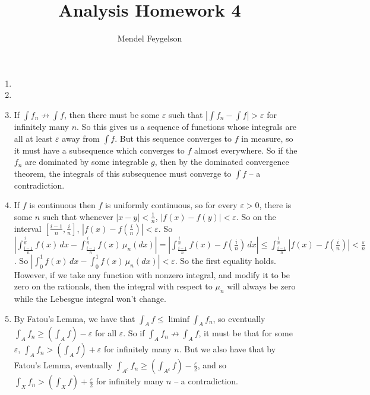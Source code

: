 \documentclass{article}
\title{Analysis Homework 4}
\author{Mendel Feygelson}
\begin{document}
\maketitle
\begin{enumerate}

  \item 
  \item
  \item If $\int f_n \not\to \int f$, then there must be some $\varepsilon$ such
     that $|\int f_n - \int f| > \varepsilon$ for infinitely many $n$. So this
     gives us a sequence of functions whose integrals are all at least
     $\varepsilon$ away from $\int f$. But this sequence converges to $f$ in
     measure, so it must have a subsequence which converges to $f$ almost
     everywhere. So if the $f_n$ are dominated by some integrable $g$, then by
     the dominated convergence theorem, the integrals of this subsequence must
     converge to $\int f$ -- a contradiction.

  \item

     If $f$ is continuous then $f$ is uniformly continuous, so for every
     $\varepsilon>0$, there is some $n$ such that whenever $|x-y| < \frac1n$,
     $|f(x) - f(y)| < \varepsilon$. So on the interval $[\frac{i-1}n,\frac in]$,
     $|f(x) - f(\frac in)| < \varepsilon$. So $\displaystyle{\left|\int_{\frac{i-1}n}^{\frac in}
     f(x) \, dx  - \int_{\frac{i-1}n}^{\frac in} f(x) \,\mu_n(dx)\right| =
     \left|\int_{\frac{i-1}n}^{\frac in} f(x) - f(\frac in) \,dx\right| \leq
     \int_{\frac{i-1}n}^{\frac in} |f(x) - f(\frac in)| < \frac\varepsilon n}$.
     So $|\int_0^1 f(x)\,dx - \int_0^1 f(x) \,\mu_n(dx)| < \varepsilon$. So the
     first equality holds. However, if we take any function with nonzero
     integral, and modify it to be zero on the rationals, then the integral with
     respect to $\mu_n$ will always be zero while the Lebesgue integral won't
     change.

  \item By Fatou's Lemma, we have that $\int_A f \leq \liminf \int_A f_n$, so
     eventually $\int_A f_n \geq (\int_A f) - \varepsilon$ for all
     $\varepsilon$. So if $\int_A f_n \not\to \int_A f$, it must be that for
     some $\varepsilon$, $\int_A f_n > (\int_A f) + \varepsilon$ for infinitely
     many $n$. But we also have that by Fatou's Lemma, eventually $\int_{A^c}
     f_n \geq (\int_{A^c} f) - \frac\varepsilon2$, and so $\int_X f_n > (\int_X
     f) + \frac\varepsilon2$ for infinitely many $n$ -- a contradiction.


\end{enumerate}
\end{document}

